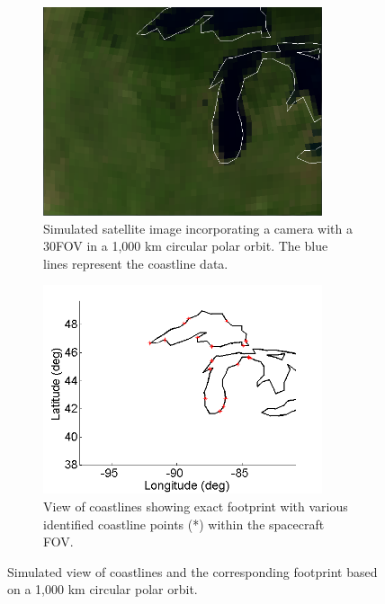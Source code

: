 \documentclass[]{aiaa-tc}%
\begin{document}
\begin{figure}[h!]
\centering
\begin{subfigure}{.48\textwidth}
  \centering
  \includegraphics[width=0.9\textwidth]{Michigan_sat}
  \caption{Simulated satellite image incorporating a camera with a 30\degree FOV in a 1,000 km circular polar orbit.  The blue lines represent the coastline data.}
  \label{fig:satellite}
\end{subfigure}\hfill
\begin{subfigure}{.48\textwidth} 
  \centering
  \includegraphics[width=0.9\textwidth]{Michigan}
  \caption{View of coastlines showing exact footprint with various identified coastline points (*) within the spacecraft FOV.}
  \label{fig:coastline}
\end{subfigure}
\caption{Simulated view of coastlines and the corresponding footprint based on a 1,000 km circular polar orbit.}
\label{fig:matlabstuff}
\end{figure}
%
%
%
\end{document}
